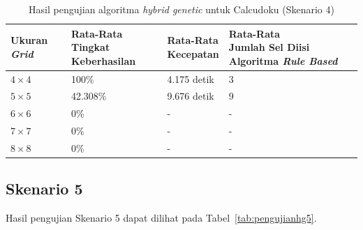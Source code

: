 \begin{table}
\centering
\captionsetup{justification=centering}
\caption[Hasil pengujian algoritma \textit{hybrid genetic} untuk Calcudoku (Skenario 4)]{Hasil pengujian algoritma \textit{hybrid genetic} untuk Calcudoku (Skenario 4)}
\begin{tabular}{| l | l | l | l |}
\hline
Ukuran \textit{Grid} & \makecell[l]{Rata-Rata \\ Tingkat Keberhasilan} & \makecell[l]{Rata-Rata \\ Kecepatan} & \makecell[l]{Rata-Rata \\ Jumlah Sel Diisi Algoritma \textit{Rule Based}} \\
\hline \hline
\begin{math}4 \times 4\end{math} & 100\% & 4.175 detik & 3 \\
\hline
\begin{math}5 \times 5\end{math} & 42.308\% & 9.676 detik & 9 \\
\hline
\begin{math}6 \times 6\end{math} & 0\% & - & - \\
\hline
\begin{math}7 \times 7\end{math} & 0\% & - & - \\
\hline
\begin{math}8 \times 8\end{math} & 0\% & - & - \\
\hline
\end{tabular}
\label{tab:pengujianhg4}
\end{table}

\clearpage

\subsection{Skenario 5}
\label{sec:skenario5}

Hasil pengujian Skenario 5 dapat dilihat pada Tabel~\ref{tab:pengujianhg5}.


